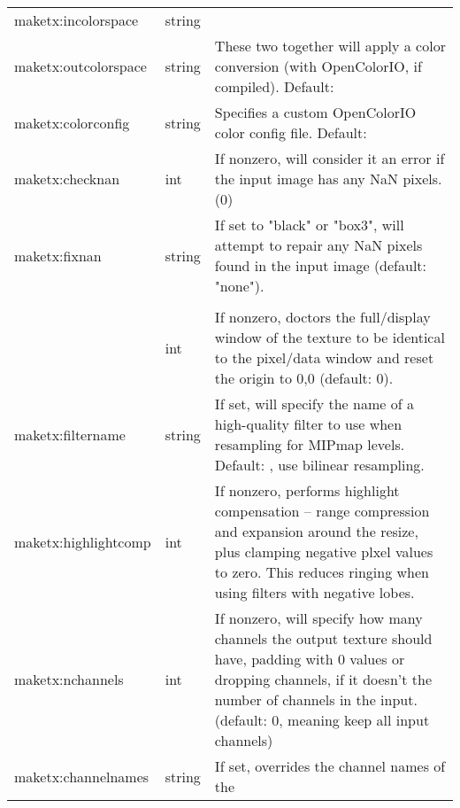 \begin{longtable}{ >{\spc \cf\small}p{1.8in} >{\cf\small}l p{3in}}
   {\small maketx:incolorspace} & string & \\
   {\small maketx:outcolorspace} & string &
                          These two together will apply a color conversion
                              (with OpenColorIO, if compiled). Default: \qkw{} \\
   {\small maketx:colorconfig} & string &
                          Specifies a custom OpenColorIO color config file.
                              Default: \qkw{} \\
   maketx:checknan & int &   If nonzero, will consider it an error if the
                              input image has any NaN pixels. (0) \\
   maketx:fixnan & string & If set to "black" or "box3", will attempt
                              to repair any NaN pixels found in the
                              input image (default: "none"). \\
   \multicolumn{2}{l}{\spc \cf\small maketx:set_full_to_pixels} \\ & int &
                          If nonzero, doctors the full/display window
                              of the texture to be identical to the
                              pixel/data window and reset the origin
                              to 0,0 (default: 0). \\
   maketx:filtername & string &
                          If set, will specify the name of a high-quality
                             filter to use when resampling for MIPmap
                             levels. Default: \qkw{}, use bilinear resampling. \\
   maketx:highlightcomp & int &
                          If nonzero, performs highlight compensation --
                             range compression and expansion around 
                             the resize, plus clamping negative plxel
                             values to zero. This reduces ringing when
                             using filters with negative lobes. \\
   maketx:nchannels & int &  If nonzero, will specify how many channels
                             the output texture should have, padding with
                             0 values or dropping channels, if it doesn't
                             the number of channels in the input.
                             (default: 0, meaning keep all input channels) \\
   maketx:channelnames & string &
                          If set, overrides the channel names of the

\end{longtable}
